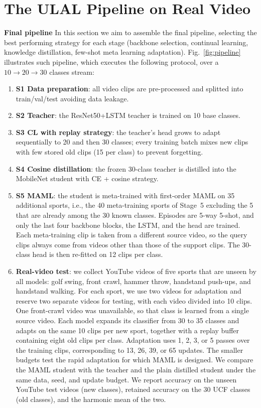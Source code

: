 \documentclass[conference]{IEEEtran}
\begin{document}
\section{The ULAL Pipeline on Real Video}
\label{sec:ulal}
\textbf{Final pipeline} 
In this section we aim to assemble the final pipeline, selecting the best performing strategy for each stage (backbone selection, continual learning, knowledge distillation, few-shot meta learning adaptation).
Fig.~\ref{fig:pipeline} illustrates such pipeline, which executes the following protocol, over a $10\!\to\!20\!\to\!30$ classes stream:
\begin{enumerate}
\item \textbf{S1 Data preparation}: all video clips are pre-processed and splitted into train/val/test avoiding data leakage.
\item \textbf{S2 Teacher}: the ResNet50+LSTM teacher is trained on 10 base classes.
\item \textbf{S3 CL with replay strategy}: the teacher's head grows to adapt sequentially to 20 and then 30 classes; every training batch
mixes new clips with few stored old clips (15 per class) to prevent forgetting.
\item \textbf{S4 Cosine distillation}: the frozen 30-class teacher is distilled into the
MobileNet student with CE + cosine strategy.
\item \textbf{S5 MAML}: the student is meta-trained with first-order MAML on 35 additional sports, i.e., the
40 meta-training sports of Stage~5 excluding the 5 that are already among the 30 known classes. Episodes are
5-way 5-shot, and only the last four backbone blocks, the LSTM, and the head are trained. Each meta-training
clip is taken from a different source video, so the query clips always come from videos other than those of
the support clips. The 30-class head is then re-fitted on 12 clips per class.
\item \textbf{Real-video test}: we collect YouTube videos of five sports that are unseen
by all models: golf swing, front crawl, hammer throw, handstand push-ups, and handstand
walking. For each sport, we use two videos for adaptation and reserve two separate videos
for testing, with each video divided into 10 clips. One front-crawl video was unavailable,
so that class is learned from a single source video. Each model expands its classifier
from 30 to 35 classes and adapts on the same 10 clips per new sport, together with a replay
buffer containing eight old clips per class. Adaptation uses 1, 2, 3, or 5 passes over the
training clips, corresponding to 13, 26, 39, or 65 updates. The smaller budgets test the
rapid adaptation for which MAML is designed. We compare the MAML student with the teacher
and the plain distilled student under the same data, seed, and update budget. We report
accuracy on the unseen YouTube test videos (new classes), retained accuracy on the 30 UCF
classes (old classes), and the harmonic mean of the two.
\end{enumerate}
\end{document}

